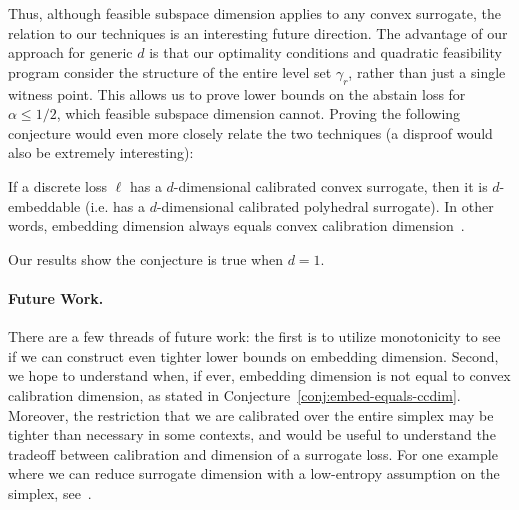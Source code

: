 \documentclass[anon]{colt2020} %
\newcommand{\Comments}{1}
\newcommand{\mynote}[2]{\ifnum\Comments=1\textcolor{#1}{#2}\fi}
\newcommand{\jessie}[1]{\mynote{purple}{[JF: #1]}}
\newcommand{\abstain}[1]{\mathrm{abstain}_{#1}}
\begin{document}
Thus, although feasible subspace dimension applies to any convex surrogate, the relation to our techniques is an interesting future direction.
The advantage of our approach for generic $d$ is that our optimality conditions and quadratic feasibility program consider the structure of the entire level set $\gamma_r$, rather than just a single witness point.
This allows us to prove lower bounds on the abstain loss for $\alpha \leq 1/2$, which feasible subspace dimension cannot.
Proving the following conjecture would even more closely relate the two techniques (a disproof would also be extremely interesting):
\begin{conjecture}\label{conj:embed-equals-ccdim}
  If a discrete loss $\ell$ has a $d$-dimensional calibrated convex surrogate, then it is $d$-embeddable (i.e. has a $d$-dimensional calibrated polyhedral surrogate).
  In other words, embedding dimension always equals convex calibration dimension~\citep{ramaswamy2016convex}.
\end{conjecture}
Our results show the conjecture is true when $d=1$.

\paragraph{Future Work.}
There are a few threads of future work: the first is to utilize monotonicity to see if we can construct even tighter lower bounds on embedding dimension.
Second, we hope to understand when, if ever, embedding dimension is not equal to convex calibration dimension, as stated in Conjecture~\ref{conj:embed-equals-ccdim}.
Moreover, the restriction that we are calibrated over the entire simplex may be tighter than necessary in some contexts, and would be useful to understand the tradeoff between calibration and dimension of a surrogate loss.
For one example where we can reduce surrogate dimension with a low-entropy assumption on the simplex, see~\cite[Example 6]{agarwal2015consistent}.

%
\newpage
\end{document}
